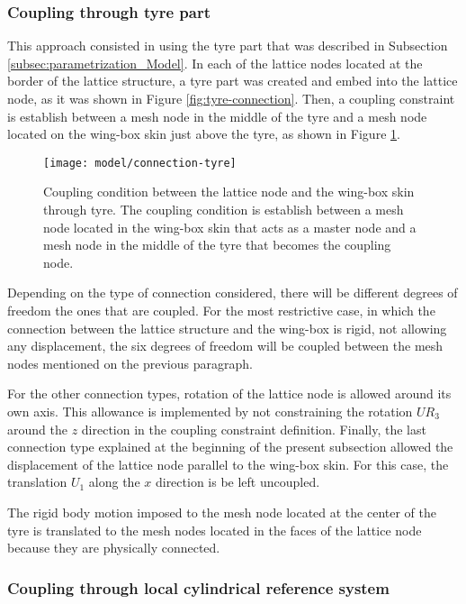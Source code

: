 \subsubsection{Coupling through tyre part}

This approach consisted in using the tyre part that was described in Subsection \ref{subsec:parametrization_Model}. In each of the lattice nodes located at the border of the lattice structure, a tyre part was created and embed into the lattice node, as it was shown in Figure \ref{fig:tyre-connection}. Then, a coupling constraint is establish between a mesh node in the middle of the tyre and a mesh node located on the wing-box skin just above the tyre, as shown in Figure \ref{fig:connection-tyre}.

\begin{figure}[!htpb]
  \centering
  \texttt{[image: model/connection-tyre]}
  \caption[Coupling condition between the lattice node and the wing-box skin through tyre]{Coupling condition between the lattice node and the wing-box skin through tyre. The coupling condition is establish between a mesh node located in the wing-box skin that acts as a master node and a mesh node in the middle of the tyre that becomes the coupling node.}\label{fig:connection-tyre}
\end{figure}

Depending on the type of connection considered, there will be different degrees of freedom the ones that are coupled. For the most restrictive case, in which the connection between the lattice structure and the wing-box is rigid, not allowing any displacement, the six degrees of freedom will be coupled between the mesh nodes mentioned on the previous paragraph.

For the other connection types, rotation of the lattice node is allowed around its own axis. This allowance is implemented by not constraining the rotation $UR_3$ around the $z$ direction in the coupling constraint definition. Finally, the last connection type explained at the beginning of the present subsection allowed the displacement of the lattice node parallel to the wing-box skin. For this case, the translation $U_1$ along the $x$ direction is be left uncoupled.

The rigid body motion imposed to the mesh node located at the center of the tyre is translated to the mesh nodes located in the faces of the lattice node because they are physically connected.

\subsubsection{Coupling through local cylindrical reference system}

